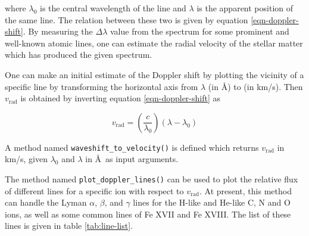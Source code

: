                 where $\lambda_0$ is the central wavelength of the line and $\lambda$ is the apparent position of the same line. The relation between these two is given by equation \ref{eqn-doppler-shift}. By measuring the $\Delta\lambda$ value from the spectrum for some prominent and well-known atomic lines, one can estimate the radial velocity of the stellar matter which has produced the given spectrum.
                
                One can make an initial estimate of the Doppler shift by plotting the vicinity of a specific line by transforming the horizontal  axis from $\lambda$ (in \AA) to  (in km/s). Then $v_\text{rad}$ is obtained by inverting equation \ref{eqn-doppler-shift} as
                
                \begin{equation}
                    v_\text{rad}=\left( \dfrac{c}{\lambda_0} \right)(\lambda-\lambda_0) \label{eqn-vrad}
                \end{equation}
                
                A method named \texttt{waveshift\_to\_velocity()} is defined which returns $v_\text{rad}$ in km/s, given $\lambda_0$ and $\lambda$ in \AA~as input arguments.
                
                The method named \texttt{plot\_doppler\_lines()} can be used to plot the relative flux of different lines for a specific ion with respect to $v_\text{rad}$. At present, this method can handle the Lyman $\alpha$, $\beta$, and $\gamma$ lines for the H-like and He-like C, N and O ions, as well as some common lines of Fe XVII and Fe XVIII. The list of these lines is given in table \ref{tab:line-list}.
                
